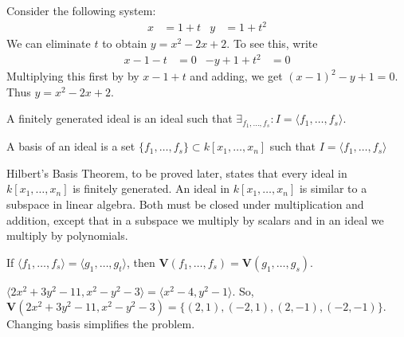 \documentclass[crop=false,class=book,oneside]{standalone}
\begin{document}
                \begin{example}
                    Consider the following system:
                    \begin{align*}
                        x&=1+t&y&=1+t^{2}
                    \end{align*}
                    We can eliminate $t$ to
                    obtain $y=x^2-2x+2$. To see this, write
                    \begin{align*}
                        x-1-t&=0&-y+1+t^{2}&=0
                    \end{align*}
                    Multiplying this first by by $x-1+t$
                    and adding, we get $(x-1)^2-y+1=0$.
                    Thus $y=x^2-2x+2$.
                \end{example}
                \begin{definition}
                    A finitely generated ideal is an ideal
                    such that
                    $\exists_{f_1,\hdots, f_s}:I=\langle f_1,\hdots, f_s\rangle$.
                \end{definition}
                \begin{definition}
                    A basis of an ideal is a set
                    $\{f_1,\hdots, f_s\}\subset k[x_1,\hdots ,x_n]$
                    such that $I=\langle f_{1},\hdots,f_{s}\rangle$
                \end{definition}
                Hilbert's Basis Theorem, to be proved later, states
                that every ideal in $k[x_{1},\hdots,x_{n}]$ is finitely
                generated. An ideal in $k[x_{1},\hdots,x_{n}]$ is similar
                to a subspace in linear algebra. Both must be closed
                under multiplication and addition, except that in a
                subspace we multiply by scalars and in an ideal
                we multiply by polynomials. 
                \begin{theorem}
                    If $\langle f_1,\hdots,f_s\rangle=\langle g_1,\hdots,g_t\rangle$,
                    then $\mathbf{V}(f_1,\hdots, f_s)=\mathbf{V}(g_1,\hdots, g_s)$.
                \end{theorem}
                \begin{example}
                    $\langle2x^2+3y^2-11,x^2-y^2-3\rangle%
                     =\langle x^2-4,y^2-1\rangle$.
                    So,
                    $\mathbf{V}(2x^2+3y^2-11,x^2-y^2-3)%
                     =\{(2,1),(-2,1),(2,-1),(-2,-1)\}$.
                    Changing basis simplifies the problem.
                \end{example}
\end{document}
